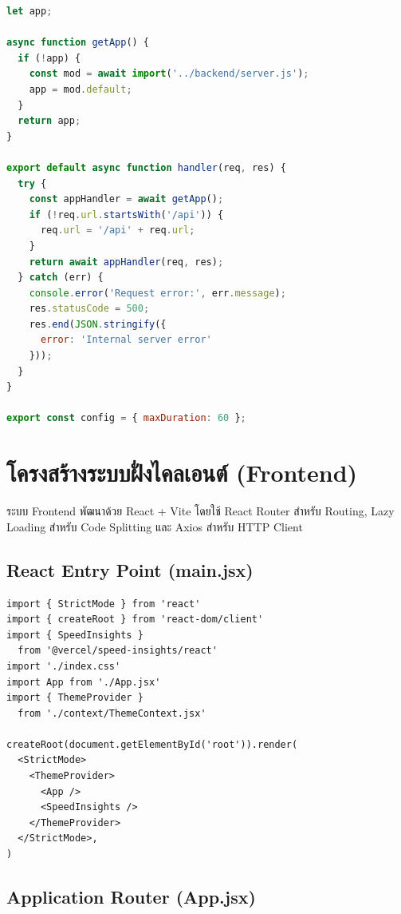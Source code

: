 \begin{lstlisting}[language=JavaScript, caption={api/handler.js -- Vercel Serverless Handler}]
let app;

async function getApp() {
  if (!app) {
    const mod = await import('../backend/server.js');
    app = mod.default;
  }
  return app;
}

export default async function handler(req, res) {
  try {
    const appHandler = await getApp();
    if (!req.url.startsWith('/api')) {
      req.url = '/api' + req.url;
    }
    return await appHandler(req, res);
  } catch (err) {
    console.error('Request error:', err.message);
    res.statusCode = 500;
    res.end(JSON.stringify({
      error: 'Internal server error'
    }));
  }
}

export const config = { maxDuration: 60 };
\end{lstlisting}

\section{โครงสร้างระบบฝั่งไคลเอนต์ (Frontend)}

\hspace*{1.3em}
ระบบ Frontend พัฒนาด้วย React + Vite โดยใช้ React Router สำหรับ Routing, Lazy Loading สำหรับ Code Splitting และ Axios สำหรับ HTTP Client

\subsection{React Entry Point (main.jsx)}

\begin{lstlisting}[language=JSX, caption={frontend/src/main.jsx -- React Application Entry}]
import { StrictMode } from 'react'
import { createRoot } from 'react-dom/client'
import { SpeedInsights }
  from '@vercel/speed-insights/react'
import './index.css'
import App from './App.jsx'
import { ThemeProvider }
  from './context/ThemeContext.jsx'

createRoot(document.getElementById('root')).render(
  <StrictMode>
    <ThemeProvider>
      <App />
      <SpeedInsights />
    </ThemeProvider>
  </StrictMode>,
)
\end{lstlisting}

\subsection{Application Router (App.jsx)}

